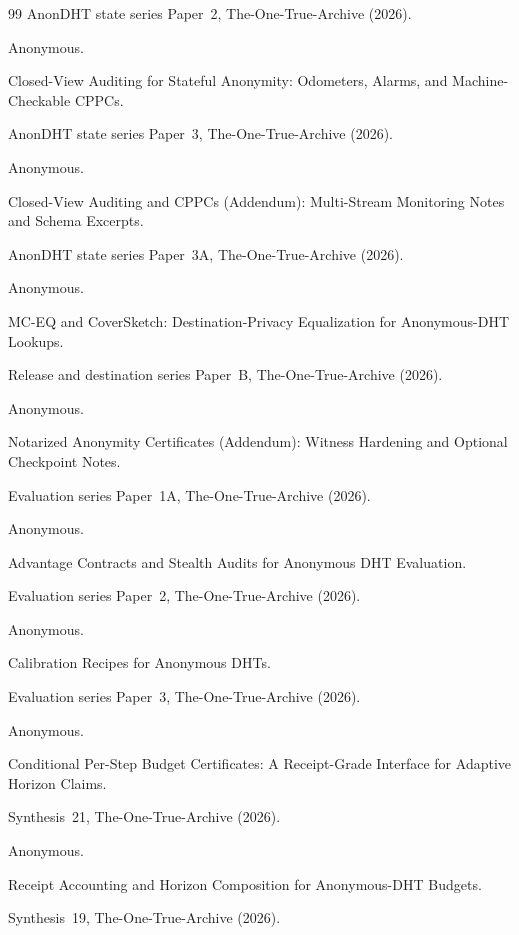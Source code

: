 \documentclass[11pt]{article}
\begin{document}
\begin{thebibliography}{99}
\newblock AnonDHT state series Paper~2, The-One-True-Archive (2026).

Anonymous.

\newblock Closed-View Auditing for Stateful Anonymity: Odometers, Alarms, and Machine-Checkable CPPCs.

\newblock AnonDHT state series Paper~3, The-One-True-Archive (2026).

Anonymous.

\newblock Closed-View Auditing and CPPCs (Addendum): Multi-Stream Monitoring Notes and Schema Excerpts.

\newblock AnonDHT state series Paper~3A, The-One-True-Archive (2026).

Anonymous.

\newblock MC-EQ and CoverSketch: Destination-Privacy Equalization for Anonymous-DHT Lookups.

\newblock Release and destination series Paper~B, The-One-True-Archive (2026).

Anonymous.

\newblock Notarized Anonymity Certificates (Addendum): Witness Hardening and Optional Checkpoint Notes.

\newblock Evaluation series Paper~1A, The-One-True-Archive (2026).

Anonymous.

\newblock Advantage Contracts and Stealth Audits for Anonymous DHT Evaluation.

\newblock Evaluation series Paper~2, The-One-True-Archive (2026).

Anonymous.

\newblock Calibration Recipes for Anonymous DHTs.

\newblock Evaluation series Paper~3, The-One-True-Archive (2026).

Anonymous.

\newblock Conditional Per-Step Budget Certificates: A Receipt-Grade Interface for Adaptive Horizon Claims.

\newblock Synthesis~21, The-One-True-Archive (2026).

Anonymous.

\newblock Receipt Accounting and Horizon Composition for Anonymous-DHT Budgets.

\newblock Synthesis~19, The-One-True-Archive (2026).



\end{thebibliography}
\end{document}

